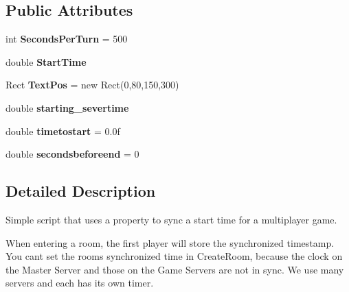 \subsection*{Public Attributes}
\begin{DoxyCompactItemize}
\item 
int {\bfseries Seconds\+Per\+Turn} = 500\hypertarget{class_in_room_round_timer_a3fbc46448a70dff996a45f508d3e3cc8}{}\label{class_in_room_round_timer_a3fbc46448a70dff996a45f508d3e3cc8}

\item 
double {\bfseries Start\+Time}\hypertarget{class_in_room_round_timer_a22ba8013f8081643dfffeb95e049a97c}{}\label{class_in_room_round_timer_a22ba8013f8081643dfffeb95e049a97c}

\item 
Rect {\bfseries Text\+Pos} = new Rect(0,80,150,300)\hypertarget{class_in_room_round_timer_a1844d64936fc01a304de92179ac0cd4e}{}\label{class_in_room_round_timer_a1844d64936fc01a304de92179ac0cd4e}

\item 
double {\bfseries starting\+\_\+severtime}\hypertarget{class_in_room_round_timer_a2399b0658c888b108f2c75f9d2fbb41c}{}\label{class_in_room_round_timer_a2399b0658c888b108f2c75f9d2fbb41c}

\item 
double {\bfseries timetostart} = 0.\+0f\hypertarget{class_in_room_round_timer_aa0c3ea404ae1bc85c1cc36626ae2bed8}{}\label{class_in_room_round_timer_aa0c3ea404ae1bc85c1cc36626ae2bed8}

\item 
double {\bfseries secondsbeforeend} = 0\hypertarget{class_in_room_round_timer_a913c06f7ecff0d23be4041c9eb5fb69a}{}\label{class_in_room_round_timer_a913c06f7ecff0d23be4041c9eb5fb69a}

\end{DoxyCompactItemize}


\subsection{Detailed Description}
Simple script that uses a property to sync a start time for a multiplayer game. 

When entering a room, the first player will store the synchronized timestamp. You can\textquotesingle{}t set the room\textquotesingle{}s synchronized time in Create\+Room, because the clock on the Master Server and those on the Game Servers are not in sync. We use many servers and each has it\textquotesingle{}s own timer.

